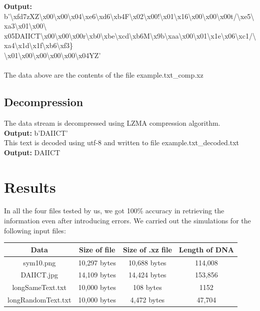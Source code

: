 \documentclass[11pt]{article}
\begin{document}
\textbf{Output:} b'\textbackslash xfd7zXZ\textbackslash x00\textbackslash x00\textbackslash x04\textbackslash xe6\textbackslash xd6\textbackslash xb4F\textbackslash x02\textbackslash x00!\textbackslash x01\textbackslash x16\textbackslash x00\textbackslash x00\textbackslash x00t/\textbackslash xe5\textbackslash xa3\textbackslash x01\textbackslash x00\textbackslash \\ x05DAIICT\textbackslash x00\textbackslash x00\textbackslash x00r\textbackslash xb0\textbackslash xbe\textbackslash xcd\textbackslash xb6M\textbackslash x9b\textbackslash xaa\textbackslash x00\textbackslash x01\textbackslash x1e\textbackslash x06\textbackslash xc1/\textbackslash xa4\textbackslash x1d\textbackslash x1f\textbackslash xb6\textbackslash xf3\} \\ \textbackslash x01\textbackslash x00\textbackslash x00\textbackslash x00\textbackslash x00\textbackslash x04YZ'
\\ \\
The data above are the contents of the file example.txt\_comp.xz

\subsection{Decompression}

The data stream is decompressed using LZMA compression algorithm. \\

\textbf{Output:} b'DAIICT' \\

This text is decoded using utf-8 and written to file example.txt\_decoded.txt \\

\textbf{Output:} DAIICT

\section{Results}

In all the four files tested by us, we got 100\% accuracy in retrieving the information even after introducing errors. We carried out the simulations for the following input files:
\begin{center}

\begin{tabular}{ |c|c|c|c| }
\hline
Data & Size of file & Size of .xz file & Length of DNA\\
\hline
sym10.png & 10,297 bytes & 10,688 bytes & 114,008\\
DAIICT.jpg & 14,109 bytes & 14,424 bytes & 153,856\\
longSameText.txt & 10,000 bytes & 108 bytes & 1152\\
longRandomText.txt & 10,000 bytes & 4,472 bytes & 47,704\\
\hline
\end{tabular}
\end{center}
\end{document}
